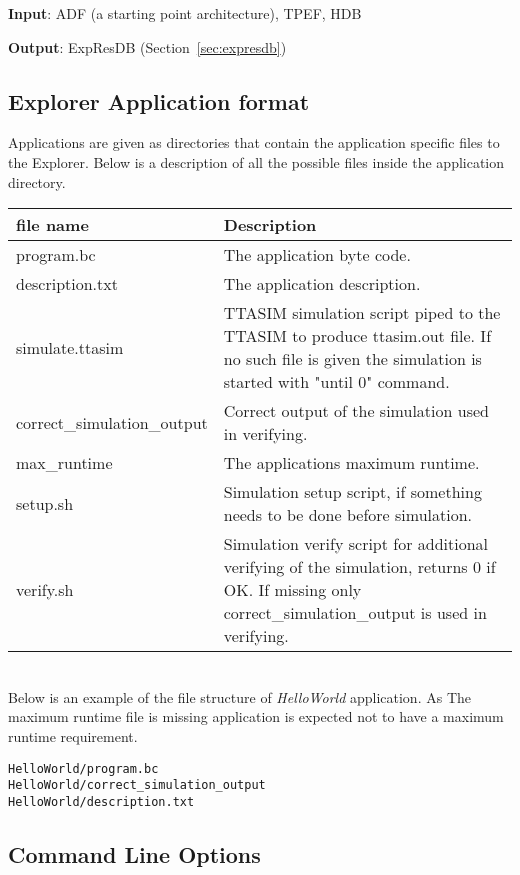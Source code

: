\documentclass[twoside]{tceusermanual}
\begin{document}
\textbf{Input}: ADF (a starting point architecture), TPEF, HDB

\textbf{Output}: ExpResDB (Section~\ref{sec:expresdb})

\subsection{Explorer Application format}

Applications are given as directories that contain the application specific
files to the Explorer. Below is a description of all the possible files inside
the application directory.

\begin{tabular}{p{}p{}}
\textbf{file name} &\textbf{Description} \\
\hline
program.bc & The application byte code.\\
description.txt & The application description.\\
simulate.ttasim & TTASIM simulation script piped to the TTASIM to produce
ttasim.out file. If no such file is given the simulation is started with
"until 0" command.\\
correct\_simulation\_output & Correct output of the simulation used in
verifying.\\
max\_runtime & The applications maximum runtime.\\
setup.sh & Simulation setup script, if something needs to be done before
simulation.\\
verify.sh & Simulation verify script for additional verifying of the
simulation, returns 0 if OK. If missing only correct\_simulation\_output is used
in verifying.\\
\end{tabular}\\

Below is an example of the file structure of \emph{HelloWorld} application.
As The maximum runtime file is missing application is expected not to have a
maximum runtime requirement.
\begin{verbatim}
HelloWorld/program.bc
HelloWorld/correct_simulation_output
HelloWorld/description.txt
\end{verbatim}

\subsection{Command Line Options}
\end{document}
